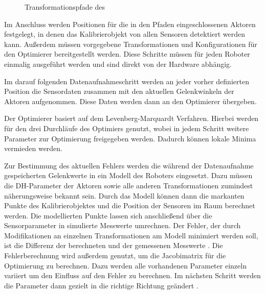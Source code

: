 \begin{figure}[Htbp] \centering {}
   \caption{Transformationspfade des \cob} \label{fig:pfade} \end{figure}

Im Anschluss werden Positionen für die in den Pfaden eingeschlossenen Aktoren
festgelegt, in denen das Kalibrierobjekt von allen Sensoren detektiert werden
kann. Außerdem müssen vorgegebene Transformationen und Konfigurationen für den
Optimierer bereitgestellt werden. Diese Schritte müssen für jeden Roboter
einmalig ausgeführt werden und sind direkt von der Hardware abhängig. 

Im darauf folgenden Datenaufnahmeschritt werden an jeder vorher definierten
Position die Sensordaten zusammen mit den aktuellen Gelenkwinkeln der Aktoren
aufgenommen. Diese Daten werden dann an den Optimierer übergeben.

Der Optimierer basiert auf dem Levenberg-Marquardt Verfahren\cite[Abschnitt 1]{pr2_estimation}.
Hierbei werden
für den \cob drei Durchläufe des Optimiers genutzt, wobei in jedem Schritt
weitere Parameter zur Optimierung freigegeben werden. Dadurch können lokale
Minima vermieden werden.

Zur Bestimmung des aktuellen Fehlers werden die während der Datenaufnahme
gespeicherten Gelenkwerte in ein Modell des Roboters eingesetzt. Dazu müssen
die \ac{DH-Parameter} der Aktoren sowie alle anderen Transformationen zumindest
näherungsweise bekannt sein. Durch das Modell können dann die markanten Punkte
des Kalibrierobjektes und die Position der Sensoren im Raum berechnet werden.
Die modellierten Punkte lassen sich anschließend über die Sensorparameter in
simulierte Messwerte umrechnen. Der Fehler, der durch Modifikationen an einzelnen
Transformationen am Modell minimiert werden soll, ist die Differenz der
berechneten und der gemessenen Messwerte \cite{levi2012autonomous}.
Die Fehlerberechnung wird außerdem genutzt, um die Jacobimatrix für die Optimierung zu berechnen. Dazu werden alle
vorhandenen Parameter einzeln variiert um den Einfluss auf den Fehler zu berechnen.
Im nächsten Schritt werden die Parameter dann gezielt in die richtige Richtung
geändert \cite{forsyth2011}.




